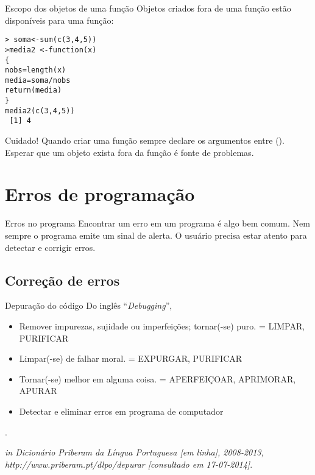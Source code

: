 \documentclass[handout]{beamer}
\begin{document}
\begin{frame}{Escopo dos objetos de uma função}
Objetos criados fora de uma função estão disponíveis para uma função: 

\texttt{> soma<-sum(c(3,4,5))\\
>media2 <-function(x)\\
\hspace{30pt} \{\\
\hspace{30pt} nobs=length(x)\\
\hspace{30pt} media=soma/nobs\\
\hspace{30pt} return(media)\\
\hspace{30pt}\}\\
media2(c(3,4,5))\\
~[1] 4}
\pause 

Cuidado! Quando criar uma função sempre declare os argumentos entre (). Esperar que um objeto exista fora da função é fonte de problemas.
\end{frame}




\section{Erros de programação}
\begin{frame}{Erros no programa}
Encontrar um erro em um programa é algo bem comum. Nem sempre o  programa emite um sinal de alerta. O usuário precisa estar atento para detectar e corrigir erros.
  
\end{frame}
\subsection{Correção de erros}
\begin{frame}{Depuração do código}
 Do inglês ``\textit{Debugging}'',
 \begin{itemize}
 \item  Remover impurezas, sujidade ou imperfeições; tornar(-se)
   puro. = LIMPAR, PURIFICAR

   \item Limpar(-se) de falhar moral. = EXPURGAR, PURIFICAR

   \item  Tornar(-se) melhor em alguma coisa. = APERFEIÇOAR,
   APRIMORAR, APURAR

   \item Detectar e eliminar erros em programa de computador
 \end{itemize}
.

\textit{ in Dicionário Priberam da Língua Portuguesa [em linha], 2008-2013, http://www.priberam.pt/dlpo/depurar [consultado em 17-07-2014]}.  

\end{frame}
\end{document}
